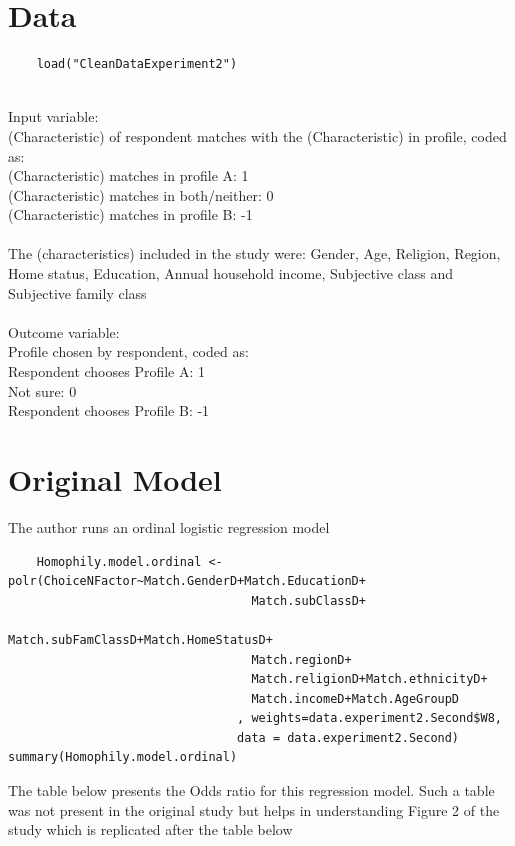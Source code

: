 \documentclass{article}
\begin{document}
\section{Data}

\begin{verbatim}
    load("CleanDataExperiment2")
\end{verbatim}
\\
Input variable:
\\
(Characteristic) of respondent matches with the (Characteristic) 
in profile, coded as:
\\
(Characteristic) matches in profile A: 1
\\
(Characteristic) matches in both/neither: 0
\\
(Characteristic) matches in profile B: -1
\\
\\
The (characteristics) included in the study were: Gender, Age, Religion, Region, Home status, Education, Annual household income, Subjective class and Subjective family class
\\
\\
Outcome variable:
\\
Profile chosen by respondent, coded as:
\\
Respondent chooses Profile A: 1
\\
Not sure: 0
\\
Respondent chooses Profile B: -1
\\

\section{Original Model}
The author runs an ordinal logistic regression model
\begin{verbatim}
    Homophily.model.ordinal <- polr(ChoiceNFactor~Match.GenderD+Match.EducationD+
                                  Match.subClassD+
                                  Match.subFamClassD+Match.HomeStatusD+
                                  Match.regionD+  
                                  Match.religionD+Match.ethnicityD+
                                  Match.incomeD+Match.AgeGroupD
                                , weights=data.experiment2.Second$W8, 
                                data = data.experiment2.Second)
summary(Homophily.model.ordinal)

\end{verbatim}
The table below presents the Odds ratio for this regression model. Such a table was not present in the original study but helps in understanding Figure 2 of the study which is replicated after the table below
\end{document}
